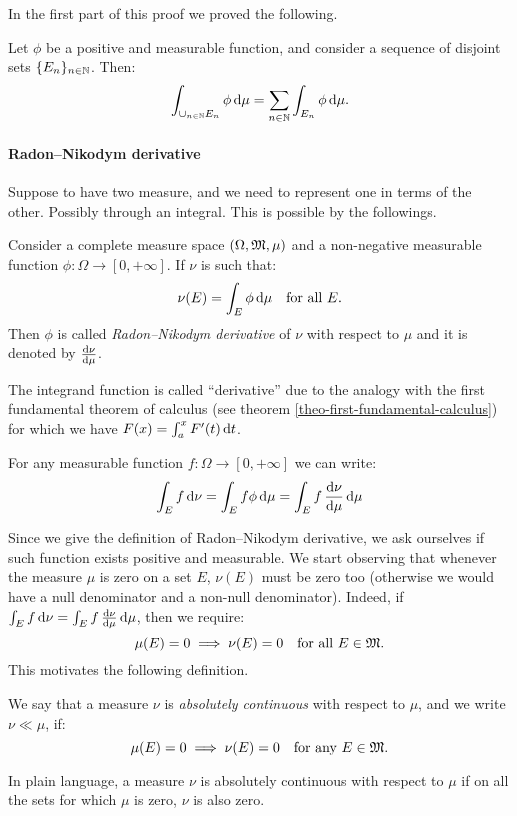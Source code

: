 In the first part of this proof we proved the following.
\begin{coro}
	Let $\phi$ be a positive and measurable function, and consider a sequence of disjoint sets $\{E_n\}_{n\in\mathbb N}$. Then:
	$$\int_{\cup_{n \in \mathbb N} E_n} \phi\, \mathrm d\mu = \sum_{n\in\mathbb N}\int_{E_n} \phi \, \mathrm d\mu.$$
\end{coro}


\paragraph{Radon--Nikodym derivative} Suppose to have two measure, and we need to represent one in terms of the other. Possibly through an integral. This is possible by the followings.
\begin{defn}
	Consider a complete measure space $(\Omega,\mathfrak M,\mu)$ and a non-negative measurable function $\phi: \Omega \to [0,+\infty]$. If $\nu$ is such that:
	$$
		\nu(E) 
		= \int_E \phi \, \mathrm d \mu 
		\quad \text{for all }  E
	.
	$$
	Then $\phi$ is called \emph{Radon--Nikodym derivative} of $\nu$ with respect to $\mu$ and it is denoted by $\frac {\mathrm d\nu }{\mathrm d\mu}$.
\end{defn}
The integrand function is called ``derivative'' due to the analogy with the first fundamental theorem of calculus (see theorem \vref{theo-first-fundamental-calculus}) for which we have $F(x) = \int_a^x F'(t) \,\mathrm d t$.

For any measurable function $f:\Omega \to \left[0,+\infty\right]$ we can write:
\[
	\int_E f \,\mathrm d\nu =\int_E f \phi \,\mathrm d\mu = \int_E f \, \frac{\mathrm d\nu}{\mathrm d\mu} \,\mathrm d\mu
\]

Since we give the definition of Radon--Nikodym derivative, we ask ourselves if such function exists positive and measurable. We start observing that whenever the measure $\mu$ is zero on a set $E$, $\nu(E)$ must be zero too (otherwise we would have a null denominator and a non-null denominator). Indeed, if $\int_E f \,\mathrm d\nu = \int_E f \, \tfrac{\mathrm d\nu}{\mathrm d\mu} \,\mathrm d\mu$, then we require:
$$
	\mu(E) 
	= 0 
	\implies 
	\nu(E)
	= 0 
	\quad \text{for all } E \in \mathfrak M
.
$$
This motivates the following definition.

\begin{defn}
	We say that a measure $\nu$ is \emph{absolutely continuous} with respect to $\mu$, and we write $\nu \ll \mu$, if:
	$$
		\mu(E) 
		= 0 
		\implies \nu(E)
		= 0 
		\quad \text{for any } E \in \mathfrak M
	.
	$$
\end{defn}
In plain language, a measure $\nu$ is absolutely continuous with respect to $\mu$ if on all the sets for which $\mu$ is zero, $\nu$ is also zero.

